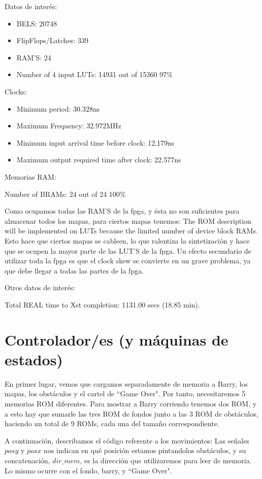 \documentclass[11pt, a4paper, spanish, openright, twoside]{book}
\begin{document}
	Datos de interés:
	\begin{itemize}
	\item BELS: 20748
	\item FlipFlops/Latches: 339
	\item RAM'S: 24
	\item  Number of 4 input LUTs:  14931  out of  15360    97\%  


\end{itemize}
	Clocks:
	\begin{itemize}
	\item  Minimum period: 30.328ns 
	\item 	Maximum Frequency: 32.972MHz
 	\item  Minimum input arrival time before clock: 12.179ns
   	\item Maximum output required time after clock: 22.577ns

\end{itemize}
	Memorias RAM:
	
	Number of BRAMs:    24  out of     24   100\%  

	Como ocupamos todas las RAM'S de la fpga, y ésta no son suficientes para almacenar todos los mapas, para ciertos mapas tenemos:
		The ROM description  will be implemented on LUTs because the limited number of device block RAMs.
	Esto hace que ciertos mapas se cableen, lo que ralentiza la sintetización y hace que se ocupen la mayor parte de las LUT'S de la fpga.
	Un efecto secundario de utilizar toda la fpga es que el clock skew se convierte en un grave problema, ya que debe llegar a todas 
	 las partes de la fpga.

	Otros datos de interés:
	
	Total REAL time to Xst completion: 1131.00 secs (18.85 min).

\section{Controlador/es (y máquinas de estados)}
En primer lugar, vemos que cargamos separadamente de memoria a Barry,  los mapas, los obstáculos y el cartel de ``Game Over". Por tanto, necesitaremos 5 memorias ROM diferentes. Para mostrar a Barry corriendo tenemos dos ROM, y a esto hay que sumarle las tres ROM de fondos junto a las 3 ROM de obstáculos, haciendo un total de 9 ROMs, cada una del tamaño correspondiente. 

A continuación, describamos el código referente a los movimientos:
Las señales $posy$ y $posx$ nos indican en qué posición estamos pintandolos obstáculos, y su concatenación, $dir\_mem$, es la dirección que utilizaremos para leer de memoria. Lo mismo ocurre con el fondo, barry, y ``Game Over".
\end{document}
